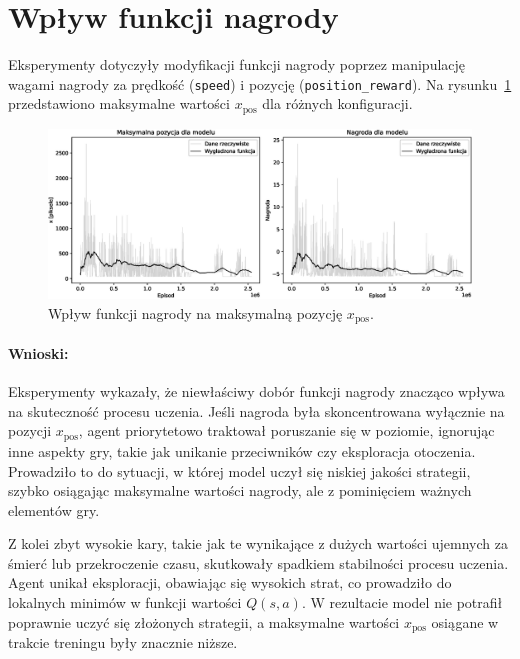 \section{Wpływ funkcji nagrody}

Eksperymenty dotyczyły modyfikacji funkcji nagrody poprzez manipulację wagami nagrody za prędkość (\texttt{speed}) i pozycję (\texttt{position\_reward}). Na rysunku~\ref{fig:reward_comparison} przedstawiono maksymalne wartości \(x_{\text{pos}}\) dla różnych konfiguracji.

\begin{figure}[!ht]
	\centering
	\includegraphics[width=\textwidth]{plots/reward.eps}
	\caption{Wpływ funkcji nagrody na maksymalną pozycję \(x_{\text{pos}}\).}
	\label{fig:reward_comparison}
\end{figure}
\paragraph{Wnioski:}

Eksperymenty wykazały, że niewłaściwy dobór funkcji nagrody znacząco wpływa na skuteczność procesu uczenia. Jeśli nagroda była skoncentrowana wyłącznie na pozycji \(x_{\text{pos}}\), agent priorytetowo traktował poruszanie się w poziomie, ignorując inne aspekty gry, takie jak unikanie przeciwników czy eksploracja otoczenia. Prowadziło to do sytuacji, w której model uczył się niskiej jakości strategii, szybko osiągając maksymalne wartości nagrody, ale z pominięciem ważnych elementów gry.

Z kolei zbyt wysokie kary, takie jak te wynikające z dużych wartości ujemnych za śmierć lub przekroczenie czasu, skutkowały spadkiem stabilności procesu uczenia. Agent unikał eksploracji, obawiając się wysokich strat, co prowadziło do lokalnych minimów w funkcji wartości \(Q(s, a)\). W rezultacie model nie potrafił poprawnie uczyć się złożonych strategii, a maksymalne wartości \(x_{\text{pos}}\) osiągane w trakcie treningu były znacznie niższe.

